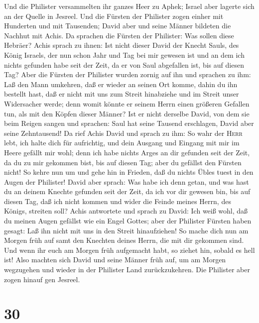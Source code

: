  Und die Philister versammelten ihr ganzes Heer zu Aphek;
Israel aber lagerte sich an der Quelle in Jesreel.  Und
die Fürsten der Philister zogen einher mit Hunderten und mit Tausenden;
David aber und seine Männer bildeten die Nachhut mit Achis.
 Da sprachen die Fürsten der Philister: Was sollen diese
Hebräer? Achis sprach zu ihnen: Ist nicht dieser David der Knecht Sauls,
des König Israels, der nun schon Jahr und Tag bei mir gewesen ist und an
dem ich nichts gefunden habe seit der Zeit, da er von Saul abgefallen
ist, bis auf diesen Tag?  Aber die Fürsten der Philister
wurden zornig auf ihn und sprachen zu ihm: Laß den Mann umkehren, daß er
wieder an seinen Ort komme, dahin du ihn bestellt hast, daß er nicht mit
uns zum Streit hinabziehe und im Streit unser Widersacher werde; denn
womit könnte er seinem Herrn einen größeren Gefallen tun, als mit den
Köpfen dieser Männer?  Ist er nicht derselbe David, von
dem sie beim Reigen sangen und sprachen: Saul hat seine Tausend
erschlagen, David aber seine Zehntausend!  Da rief Achis
David und sprach zu ihm: So wahr der \textsc{Herr} lebt, ich halte dich
für aufrichtig, und dein Ausgang und Eingang mit mir im Heere gefällt
mir wohl; denn ich habe nichts Arges an dir gefunden seit der Zeit, da
du zu mir gekommen bist, bis auf diesen Tag; aber du gefällst den
Fürsten nicht!  So kehre nun um und gehe hin in Frieden,
daß du nichts Übles tuest in den Augen der Philister! 
David aber sprach: Was habe ich denn getan, und was hast du an deinem
Knechte gefunden seit der Zeit, da ich vor dir gewesen bin, bis auf
diesen Tag, daß ich nicht kommen und wider die Feinde meines Herrn, des
Königs, streiten soll?  Achis antwortete und sprach zu
David: Ich weiß wohl, daß du meinen Augen gefällst wie ein Engel Gottes;
aber der Philister Fürsten haben gesagt: Laß ihn nicht mit uns in den
Streit hinaufziehen!  So mache dich nun am Morgen früh
auf samt den Knechten deines Herrn, die mit dir gekommen sind. Und wenn
ihr euch am Morgen früh aufgemacht habt, so ziehet hin, sobald es hell
ist!  Also machten sich David und seine Männer früh auf,
um am Morgen wegzugehen und wieder in der Philister Land zurückzukehren.
Die Philister aber zogen hinauf gen Jesreel.

\hypertarget{section-29}{%
\section{30}\label{section-29}}

